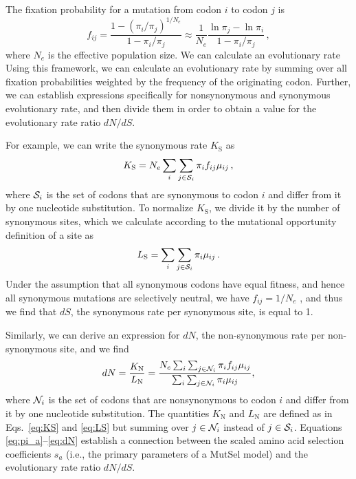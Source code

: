 \documentclass[11pt]{article}
\begin{document}
The fixation probability for a mutation from codon $i$ to codon $j$ is \cite{HalpernBruno1998,SellaHirsh2005}
\begin{equation}\label{eq:fij}
  f_{ij} = \frac{1-(\pi_i/\pi_j)^{1/N_e}}{1-\pi_i/\pi_j}
  \approx \frac{1}{N_e} \frac{\ln \pi_j - \ln \pi_i}{1-\pi_i/\pi_j}\,,
\end{equation}
where $N_e$ is the effective population size. We can calculate an evolutionary rate 
Using this framework, we can calculate an evolutionary rate by summing over all fixation probabilities weighted by the frequency of the originating codon. Further, we can establish expressions specifically for nonsynonymous and synonymous evolutionary rate, and then divide them in order to obtain a value for the evolutionary rate ratio $dN/dS$.

For example, we can write the synonymous rate $K_\text{S}$ as
\begin{equation}\label{eq:KS}
  K_\text{S} = N_e \sum_i \sum_{j \in {\cal S}_i} \pi_i  f_{ij}\mu_{ij}\,,
\end{equation}
where ${\cal S}_i$ is the set of codons that are synonymous to codon $i$ and differ from it by one nucleotide substitution. To normalize $K_\text{S}$, we divide it by the number of synonymous sites, which we calculate according to the mutational opportunity definition of a site \cite{GoldmanYang1994, Yang2006} as 
\begin{equation}\label{eq:LS}
  L_\text{S} = \sum_i \sum_{j \in {\cal S}_i} \pi_i \mu_{ij} \,.
\end{equation}
Under the assumption that all synonymous codons have equal fitness, and hence all synonymous mutations are selectively neutral, we have $f_{ij}=1/N_e$ \cite{CrowKimura1970}, and thus we find that $dS$, the synonymous rate per synonymous site, is equal to 1.

Similarly, we can derive an expression for $dN$, the non-synonymous rate per non-synonymous site, and we find
\begin{equation}\label{eq:dN}
  dN = \frac{K_\text{N}}{L_\text{N}}=\frac{ N_e \sum_i \sum_{j \in {\cal N}_i} \pi_i f_{ij} \mu_{ij} } {\sum_i \sum_{j \in {\cal N}_i} \pi_i \mu_{ij} },
\end{equation}
where ${\cal N}_i$ is the set of codons that are nonsynonymous to codon $i$ and differ from it by one nucleotide substitution. The quantities $K_\text{N}$ and $L_\text{N}$ are defined as in Eqs.~\eqref{eq:KS} and \eqref{eq:LS} but summing over $j\in {\cal N}_i$ instead of $j\in {\cal S}_i$. Equations \eqref{eq:pi_a}--\eqref{eq:dN} establish a connection between the scaled amino acid selection coefficients $s_a$ (i.e., the primary parameters of a MutSel model) and the evolutionary rate ratio $dN/dS$. 
\end{document}
